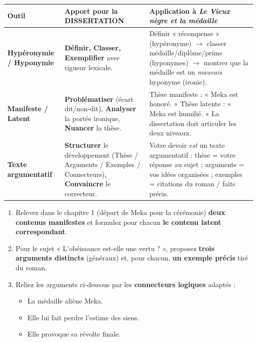 \documentclass[11pt]{article}
\begin{document}
\begin{aretenir}
\begin{center}
\begin{tabularx}{\linewidth}{|l|X|X|}
\hline
\rowcolor{popblueL}
\textbf{Outil} & \textbf{Apport pour la DISSERTATION} & \textbf{Application à \emph{Le Vieux nègre et la médaille}} \\ \hline
\textbf{Hypéronymie / Hyponymie} & \textbf{Définir, Classer, Exemplifier} avec rigueur lexicale. & Définir « récompense » (hypéronyme) $\rightarrow$ classer médaille/diplôme/prime (hyponymes) $\rightarrow$ montrer que la médaille est un \emph{mauvais} hyponyme (ironie). \\ \hline
\textbf{Manifeste / Latent} & \textbf{Problématiser} (écart dit/non-dit), \textbf{Analyser} la portée ironique, \textbf{Nuancer} la thèse. & Thèse manifeste : « Meka est honoré. » Thèse latente : « Meka est humilié. » La dissertation doit articuler les deux niveaux. \\ \hline
\textbf{Texte argumentatif} & \textbf{Structurer} le développement (Thèse / Arguments / Exemples / Connecteurs), \textbf{Convaincre} le correcteur. & Votre devoir \emph{est} un texte argumentatif : thèse = votre réponse au sujet ; arguments = vos idées organisées ; exemples = citations du roman / faits précis. \\ \hline
\end{tabularx}
\end{center}
\end{aretenir}

\begin{exercice}
\begin{enumerate}
    \item Relevez dans le chapitre 1 (départ de Meka pour la cérémonie) \textbf{deux contenus manifestes} et formulez pour chacun \textbf{le contenu latent correspondant}.
    \item Pour le sujet « L'obéissance est-elle une vertu ? », proposez \textbf{trois arguments distincts} (généraux) et, pour chacun, \textbf{un exemple précis} tiré du roman.
    \item Reliez les arguments ci-dessous par les \textbf{connecteurs logiques} adaptés : 
    \begin{itemize}
        \item[Arg. A :] La médaille aliène Meka.
        \item[Arg. B :] Elle lui fait perdre l'estime des siens.
        \item[Arg. C :] Elle provoque sa révolte finale.
    \end{itemize}
\end{enumerate}
\end{exercice}
\end{document}
